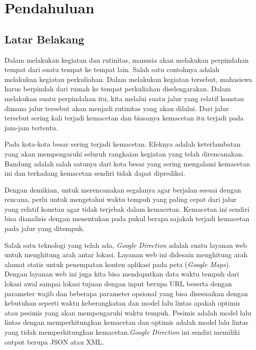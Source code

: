 \chapter{Pendahuluan}
\label{chap:intro}
   
\section{Latar Belakang}
\label{sec:label}

Dalam melakukan kegiatan dan rutinitas, manusia akan melakukan perpindahan tempat dari suatu tempat ke tempat lain. Salah satu contohnya adalah melakukan kegiatan perkuliahan. Dalam melakukan kegiatan tersebut, mahasiswa harus berpindah dari rumah ke tempat perkuliahan diselengarakan. Dalam melakukan suatu perpindahan itu, kita melalui suatu jalur yang relatif konstan dimana jalur tersebut akan menjadi rutinitas yang akan dilalui. Dari jalur tersebut sering kali terjadi kemacetan dan biasanya kemacetan itu terjadi pada jam-jam tertentu. 

Pada kota-kota besar sering terjadi kemacetan. Efeknya adalah keterlambatan yang akan mempengaruhi seluruh rangkaian kegiatan yang telah direncanakan. Bandung adalah salah satunya dari kota besar yang sering mengalami kemacetan ini dan terkadang kemacetan sendiri tidak dapat diprediksi.

Dengan demikian, untuk merencanakan segalanya agar berjalan sesuai dengan rencana, perlu untuk mengetahui waktu tempuh yang paling cepat dari jalur yang relatif konstan agar tidak terjebak dalam kemacetan. Kemacetan ini sendiri bisa dianalisis dengan menentukan pada pukul berapa sajakah terjadi kemacetan pada jalur yang ditempuh.

Salah satu teknologi yang telah ada, \textit{Google Direction} adalah suatu layanan web untuk menghitung arah antar lokasi. Layanan web ini didesain menghitung arah alamat statis untuk penempatan konten aplikasi pada peta (\textit{Google Maps}). Dengan layanan web ini juga kita bisa mendapatkan data waktu tempuh dari lokasi awal sampai lokasi tujuan dengan input berupa URL beserta dengan parameter wajib dan beberapa parameter opsional yang bisa disesuaikan dengan kebutuhan seperti waktu keberangkatan dan model lalu lintas apakah optimis atau pesimis yang akan mempengaruhi waktu tempuh. Pesimis adalah model lalu lintas dengan memperhitungkan kemacetan dan optimis adalah model lalu lintas yang tidak memperhitungkan kemacetan.\textit{Google Direction} ini sendiri memiliki output berupa JSON atau XML.

